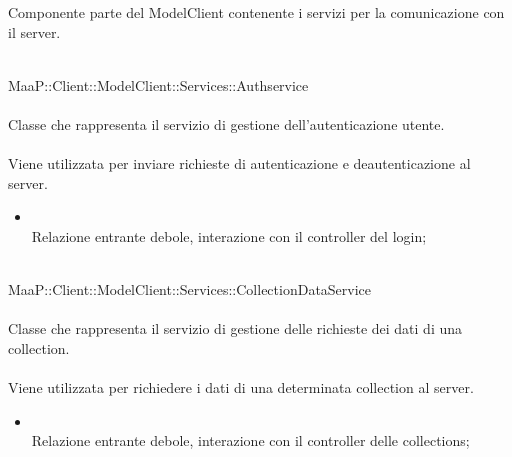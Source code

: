 Componente parte del ModelClient contenente i servizi per la comunicazione con il server.

\\
MaaP::Client::ModelClient::Services::Authservice\\
\\
Classe che rappresenta il servizio di gestione dell'autenticazione utente.\\
\\
Viene utilizzata per inviare richieste di autenticazione e deautenticazione al server.\\
\begin{itemize}
\item{}\\
Relazione entrante debole, interazione con il controller del login;
\end{itemize}

\\
MaaP::Client::ModelClient::Services::CollectionDataService\\
\\
Classe che rappresenta il servizio di gestione delle richieste dei dati di una collection.\\
\\
Viene utilizzata per richiedere i dati di una determinata collection al server.\\
\begin{itemize}
\item{}\\
Relazione entrante debole, interazione con il controller delle collections;
\end{itemize}

